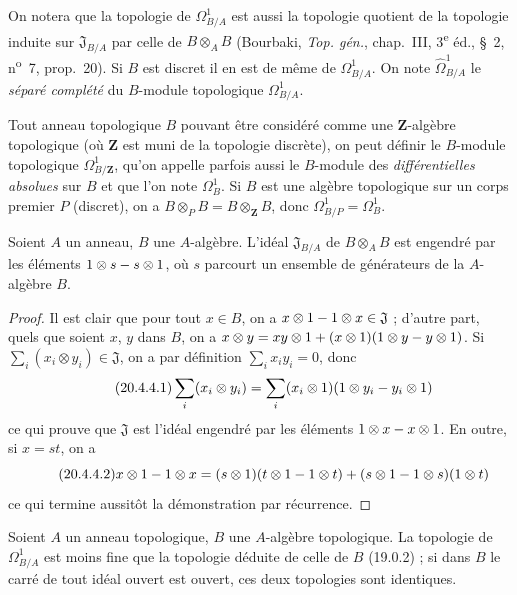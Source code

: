 On notera que la topologie de $\Omega^1_{B/A}$ est aussi la topologie quotient
de la topologie induite sur $\mathfrak{J}_{B/A}$ par celle de
$B\otimes_A B$ (Bourbaki, \emph{Top. gén.}, chap.~III, 3\textsuperscript{e}
éd., §~2, n\textsuperscript{o}~7, prop.~20). Si $B$ est discret il en est de
même de $\Omega^1_{B/A}$. On note $\widehat{\Omega}^1_{B/A}$ le
\emph{séparé complété} du $B$-module topologique $\Omega^1_{B/A}$.

Tout anneau topologique $B$ pouvant être considéré comme une
$\mathbf{Z}$-algèbre topologique (où $\mathbf{Z}$ est muni de la topologie
discrète), on peut définir le $B$-module topologique $\Omega^1_{B/\mathbf{Z}}$,
qu'on appelle parfois aussi le $B$-module des \emph{différentielles absolues}
sur $B$ et que l'on note $\Omega^1_B$. Si $B$ est une algèbre topologique sur
un corps premier $P$ (discret), on a
$B\otimes_P B=B\otimes_{\mathbf{Z}}B$, donc
$\Omega^1_{B/P}=\Omega^1_B$.

\begin{lemma}[20.4.4]
\label{0.20.4.4-fr}
Soient $A$ un anneau, $B$ une $A$-algèbre. L'idéal $\mathfrak{J}_{B/A}$ de
$B\otimes_A B$ est engendré par les éléments $1\otimes s- s\otimes1$, où $s$
parcourt un ensemble de générateurs de la $A$-algèbre $B$.
\end{lemma}

\begin{proof}
Il est clair que pour tout $x\in B$, on a
$x\otimes1- 1\otimes x\in\mathfrak{J}$ ; d'autre part, quels que soient $x$,
$y$ dans $B$, on a
$x\otimes y=xy\otimes1+(x\otimes1)(1\otimes y- y\otimes1)$. Si
$\sum_i(x_i\otimes y_i)\in\mathfrak{J}$, on a par définition
$\sum_i x_i y_i=0$, donc
\begin{equation}
\tag{20.4.4.1}
\label{0.20.4.4.1-fr}
  \sum_i(x_i\otimes y_i)=
  \sum_i(x_i\otimes1)(1\otimes y_i- y_i\otimes1)
\end{equation}
ce qui prouve que $\mathfrak{J}$ est l'idéal engendré par les éléments
$1\otimes x- x\otimes1$. En outre, si $x=st$, on a
\begin{equation}
\tag{20.4.4.2}
\label{0.20.4.4.2-fr}
  x\otimes1- 1\otimes x=(s\otimes1)(t\otimes1- 1\otimes t)
  +(s\otimes1- 1\otimes s)(1\otimes t)
\end{equation}
ce qui termine aussitôt la démonstration par récurrence.
\end{proof}

\begin{proposition}[20.4.5]
\label{0.20.4.5-fr}
Soient $A$ un anneau topologique, $B$ une $A$-algèbre topologique. La
topologie de $\Omega^1_{B/A}$ est moins fine que la topologie déduite de celle
de $B$ (19.0.2) ; si dans $B$ le carré de tout idéal ouvert est ouvert, ces
deux topologies sont identiques.
\end{proposition}

